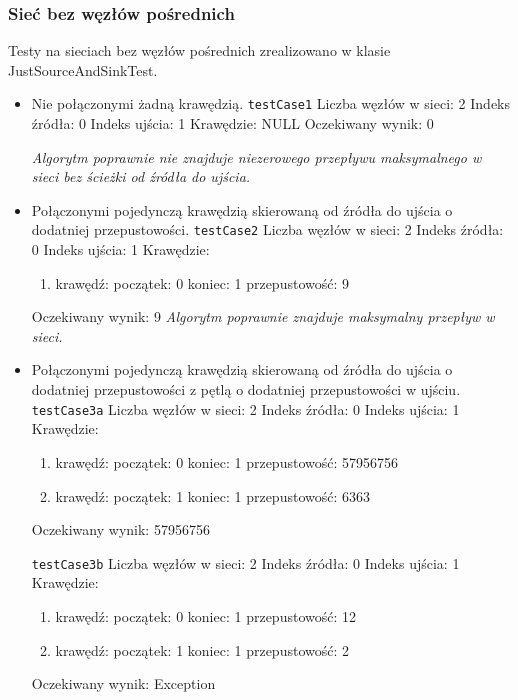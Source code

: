 \subsubsection{Sieć bez węzłów pośrednich}
Testy na sieciach bez węzłów pośrednich zrealizowano w klasie JustSourceAndSinkTest.
\begin{itemize}[nosep]
    \item Nie połączonymi żadną krawędzią.
    \texttt{testCase1}
    Liczba węzłów w sieci: 2
    Indeks źródła: 0
    Indeks ujścia: 1
    Krawędzie: NULL
    Oczekiwany wynik: 0

    \emph{Algorytm poprawnie nie znajduje niezerowego
    przepływu maksymalnego w sieci bez ścieżki od źródła do ujścia.}

    \item Połączonymi pojedynczą krawędzią skierowaną od źródła do ujścia o dodatniej przepustowości.
    \texttt{testCase2}
    Liczba węzłów w sieci: 2
    Indeks źródła: 0
    Indeks ujścia: 1
    Krawędzie:
    \begin{enumerate}[nosep]
        \item krawędź:
        początek: 0
        koniec: 1
        przepustowość: 9
    \end{enumerate}
    Oczekiwany wynik: 9
    \emph{Algorytm poprawnie znajduje maksymalny przepływ w sieci.}

    \item Połączonymi pojedynczą krawędzią skierowaną od źródła do ujścia o dodatniej przepustowości z pętlą o dodatniej przepustowości w ujściu.
    \texttt{testCase3a}
    Liczba węzłów w sieci: 2
    Indeks źródła: 0
    Indeks ujścia: 1
    Krawędzie:
    \begin{enumerate}[nosep]
        \item krawędź:
        początek: 0
        koniec: 1
        przepustowość: 57956756
        \item krawędź:
        początek: 1
        koniec: 1
        przepustowość: 6363
    \end{enumerate}
    Oczekiwany wynik: 57956756

    \texttt{testCase3b}
    Liczba węzłów w sieci: 2
    Indeks źródła: 0
    Indeks ujścia: 1
    Krawędzie:
    \begin{enumerate}[nosep]
        \item krawędź:
        początek: 0
        koniec: 1
        przepustowość: 12
        \item krawędź:
        początek: 1
        koniec: 1
        przepustowość: 2
    \end{enumerate}
    Oczekiwany wynik: Exception


\end{itemize}
